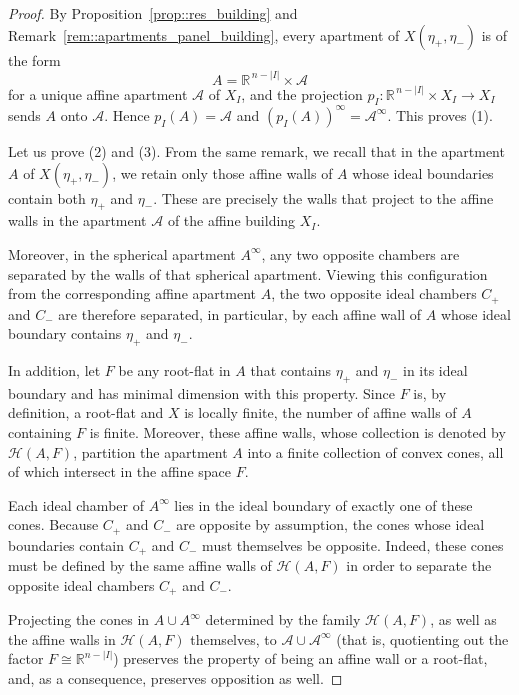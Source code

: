 \documentclass[11pt]{amsart}
\theoremstyle{plain}
\theoremstyle{definition}
\theoremstyle{remark}
\begin{document}
	\begin{proof}
		By Proposition~\ref{prop::res_building} and Remark~\ref{rem::apartments_panel_building}, every apartment of $X(\eta_+,\eta_-)$ is of the form
		\[
		A=\mathbb{R}^{\,n - |I|}\times\mathcal A
		\]
		for a unique affine apartment $\mathcal A$ of $X_I$, and the projection $p_I:\mathbb{R}^{\,n - |I|}\times X_I\to X_I$ sends $A$ onto $\mathcal A$. Hence $p_I(A)=\mathcal A$ and $(p_I(A))^\infty=\mathcal A^\infty$. This proves (1).
		
		Let us prove (2) and (3).  From the same remark, we recall that in the apartment \(A\) of \(X(\eta_{+},\eta_{-})\), we retain only those affine walls of \(A\) whose ideal boundaries contain both \(\eta_{+}\) and \(\eta_{-}\). These are precisely the walls that project to the affine walls in the apartment \(\mathcal{A}\) of the affine building \(X_I\).
		
		Moreover, in the spherical apartment \(A^\infty\), any two opposite chambers are separated by the walls of that spherical apartment. Viewing this configuration from the corresponding affine apartment \(A\), the two opposite ideal chambers \(C_{+}\) and \(C_{-}\) are therefore separated, in particular, by each affine wall of \(A\) whose ideal boundary contains \(\eta_{+}\) and \(\eta_{-}\).
		
		In addition, let \(F\) be any root-flat in \(A\) that contains \(\eta_{+}\) and \(\eta_{-}\) in its ideal boundary and has minimal
		dimension with this property. Since \(F\) is, by definition, a root-flat and \(X\) is locally finite, the number of affine walls of \(A\)
		containing \(F\) is finite. Moreover, these affine walls, whose collection is denoted by \(\mathcal{H}(A,F)\), partition the apartment \(A\) into a finite collection of convex cones, all of which intersect in the affine space \(F\).
		
		Each ideal chamber of \(A^\infty\) lies in the ideal boundary of exactly one of these cones. Because \(C_{+}\) and \(C_{-}\) are opposite by assumption, the cones whose ideal boundaries contain \(C_{+}\) and \(C_{-}\) must themselves be opposite. Indeed, these cones must be defined by the same affine walls of \(\mathcal{H}(A,F)\) in order to separate the opposite ideal chambers \(C_{+}\) and \(C_{-}\).
		
		Projecting the cones in \(A \cup A^{\infty}\) determined by the family \(\mathcal{H}(A,F)\), as well as the affine walls in \(\mathcal{H}(A,F)\) themselves, to \(\mathcal{A} \cup \mathcal{A}^{\infty}\) (that is,
		quotienting out the factor \(F \cong \mathbb{R}^{n - |I|}\)) preserves the property of being an affine wall or a root-flat, and, as a consequence, preserves opposition as well.  
		

\end{proof}
\end{document}
